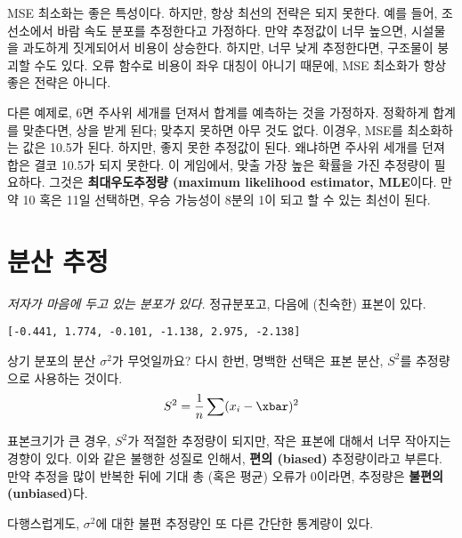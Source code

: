MSE 최소화는 좋은 특성이다. 하지만, 항상 최선의 전략은 되지 못한다.
예를 들어, 조선소에서 바람 속도 분포를 추정한다고 가정하다.
만약 추정값이 너무 높으면, 시설물을 과도하게 짓게되어서 비용이 상승한다.
하지만, 너무 낮게 추정한다면, 구조물이 붕괴할 수도 있다. 오류 함수로 비용이 좌우 대칭이 아니기 때문에, MSE 최소화가 항상 좋은 전략은 아니다.

다른 예제로, 6면 주사위 세개를 던져서 합계를 예측하는 것을 가정하자.
정확하게 합계를 맞춘다면, 상을 받게 된다; 맞추지 못하면 아무 것도 없다.
이경우, MSE를 최소화하는 값은 10.5가 된다. 하지만, 좋지 못한 추정값이 된다.
왜냐하면 주사위 세개를 던져 합은 결코 10.5가 되지 못한다. 이 게임에서,
맞출 가장 높은 확률을 가진 추정량이 필요하다. 그것은 {\bf 최대우도추정량 (maximum likelihood estimator, MLE}이다. 만약 10 혹은 11일 선택하면,
우승 가능성이 8분의 1이 되고 할 수 있는 최선이 된다.



\section{분산 추정}

{\em 저자가 마음에 두고 있는 분포가 있다.} 정규분포고, 다음에 (친숙한) 표본이 있다.

{\tt [-0.441, 1.774, -0.101, -1.138, 2.975, -2.138]}

상기 분포의 분산 $\sigma^2$가 무엇일까요? 다시 한번, 명백한 선택은
표본 분산, $S^2$를 추정량으로 사용하는 것이다.
%
\[ S^2 = \frac{1}{n} \sum (x_i - \xbar)^2 \] 
%

표본크기가 큰 경우, $S^2$가 적절한 추정량이 되지만, 작은 표본에 대해서 너무 작아지는 경향이 있다. 이와 같은 불행한 성질로 인해서, {\bf 편의 (biased)} 추정량이라고 부른다. 
만약 추정을 많이 반복한 뒤에 기대 총 (혹은 평균) 오류가 0이라면, 추정량은 
{\bf 불편의(unbiased)}다. 


다행스럽게도, $\sigma^2$에 대한 불편 추정량인 또 다른 간단한 통계량이 있다.

